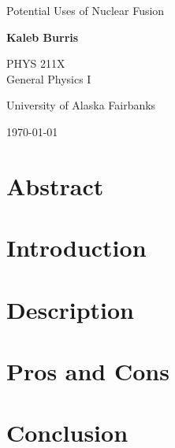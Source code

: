 \documentclass[12pt]{article}
\begin{document}
    \begin{titlepage}
        \begin{center}
            {\Huge Potential Uses of Nuclear Fusion}

            \vspace{1.5cm}

            \large \textbf{Kaleb Burris}

            \vfill

            \Large PHYS 211X \\ General Physics I

            \large University of Alaska Fairbanks
            
            \today
        \end{center}
    \end{titlepage}

    \thispagestyle{plain}

    \section{Abstract}

    \lipsum[1-2]

    \pagebreak

    \section{Introduction}

    \lipsum[3-5]

    \pagebreak

    \section{Description}

    \lipsum[6-9]

    \pagebreak

    \section{Pros and Cons}

    \lipsum[10-14]

    \pagebreak

    \section{Conclusion}

    \lipsum[15-19]

    \pagebreak

    
    
    
\end{document}
